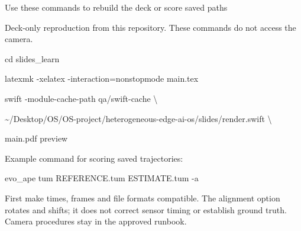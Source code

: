 \documentclass[aspectratio=169,12pt,t]{beamer}
\newcommand{\para}[1]{#1\par\medskip}
\begin{document}
\begin{frame}{Use these commands to rebuild the deck or score saved paths}

\para{Deck-only reproduction from this repository. These commands do not access the camera.}
{\small\ttfamily
cd slides\_learn\par
latexmk -xelatex -interaction=nonstopmode main.tex\par\medskip
swift -module-cache-path qa/swift-cache \textbackslash{}\par
\quad \textasciitilde/Desktop/OS/OS-project/heterogeneous-edge-ai-os/slides/render.swift \textbackslash{}\par
\quad main.pdf preview\par}
\medskip\para{Example command for scoring saved trajectories:}
{\small\ttfamily evo\_ape tum REFERENCE.tum ESTIMATE.tum -a\par}
\medskip\para{First make times, frames and file formats compatible. The alignment option rotates and shifts; it does not correct sensor timing or establish ground truth. Camera procedures stay in the approved runbook.}

\end{frame}
\end{document}
